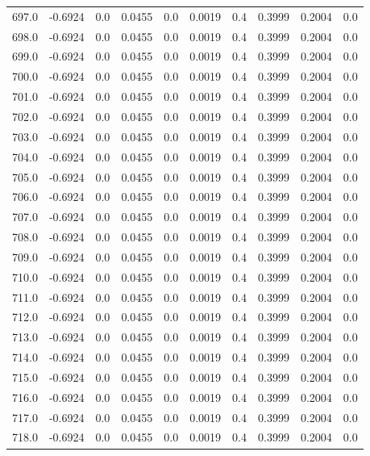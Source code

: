 \begin{longtable}{lrrrrrrrrr}
697.0 & -0.6924 & 0.0 & 0.0455 & 0.0 & 0.0019 & 0.4 & 0.3999 & 0.2004 & 0.0 \\
698.0 & -0.6924 & 0.0 & 0.0455 & 0.0 & 0.0019 & 0.4 & 0.3999 & 0.2004 & 0.0 \\
699.0 & -0.6924 & 0.0 & 0.0455 & 0.0 & 0.0019 & 0.4 & 0.3999 & 0.2004 & 0.0 \\
700.0 & -0.6924 & 0.0 & 0.0455 & 0.0 & 0.0019 & 0.4 & 0.3999 & 0.2004 & 0.0 \\
701.0 & -0.6924 & 0.0 & 0.0455 & 0.0 & 0.0019 & 0.4 & 0.3999 & 0.2004 & 0.0 \\
702.0 & -0.6924 & 0.0 & 0.0455 & 0.0 & 0.0019 & 0.4 & 0.3999 & 0.2004 & 0.0 \\
703.0 & -0.6924 & 0.0 & 0.0455 & 0.0 & 0.0019 & 0.4 & 0.3999 & 0.2004 & 0.0 \\
704.0 & -0.6924 & 0.0 & 0.0455 & 0.0 & 0.0019 & 0.4 & 0.3999 & 0.2004 & 0.0 \\
705.0 & -0.6924 & 0.0 & 0.0455 & 0.0 & 0.0019 & 0.4 & 0.3999 & 0.2004 & 0.0 \\
706.0 & -0.6924 & 0.0 & 0.0455 & 0.0 & 0.0019 & 0.4 & 0.3999 & 0.2004 & 0.0 \\
707.0 & -0.6924 & 0.0 & 0.0455 & 0.0 & 0.0019 & 0.4 & 0.3999 & 0.2004 & 0.0 \\
708.0 & -0.6924 & 0.0 & 0.0455 & 0.0 & 0.0019 & 0.4 & 0.3999 & 0.2004 & 0.0 \\
709.0 & -0.6924 & 0.0 & 0.0455 & 0.0 & 0.0019 & 0.4 & 0.3999 & 0.2004 & 0.0 \\
710.0 & -0.6924 & 0.0 & 0.0455 & 0.0 & 0.0019 & 0.4 & 0.3999 & 0.2004 & 0.0 \\
711.0 & -0.6924 & 0.0 & 0.0455 & 0.0 & 0.0019 & 0.4 & 0.3999 & 0.2004 & 0.0 \\
712.0 & -0.6924 & 0.0 & 0.0455 & 0.0 & 0.0019 & 0.4 & 0.3999 & 0.2004 & 0.0 \\
713.0 & -0.6924 & 0.0 & 0.0455 & 0.0 & 0.0019 & 0.4 & 0.3999 & 0.2004 & 0.0 \\
714.0 & -0.6924 & 0.0 & 0.0455 & 0.0 & 0.0019 & 0.4 & 0.3999 & 0.2004 & 0.0 \\
715.0 & -0.6924 & 0.0 & 0.0455 & 0.0 & 0.0019 & 0.4 & 0.3999 & 0.2004 & 0.0 \\
716.0 & -0.6924 & 0.0 & 0.0455 & 0.0 & 0.0019 & 0.4 & 0.3999 & 0.2004 & 0.0 \\
717.0 & -0.6924 & 0.0 & 0.0455 & 0.0 & 0.0019 & 0.4 & 0.3999 & 0.2004 & 0.0 \\
718.0 & -0.6924 & 0.0 & 0.0455 & 0.0 & 0.0019 & 0.4 & 0.3999 & 0.2004 & 0.0 \\

\end{longtable}
